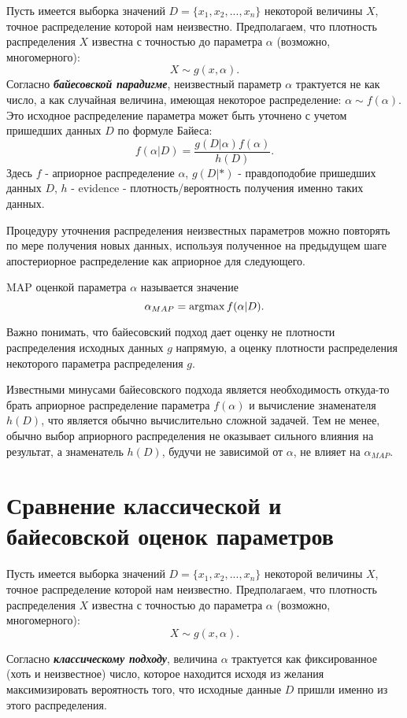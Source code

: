 Пусть имеется выборка значений $D = \{x_1, x_2, ..., x_n\}$ некоторой величины $X$, точное распределение которой нам неизвестно. Предполагаем, что плотность распределения $X$ известна с точностью до параметра $\alpha$ (возможно, многомерного): 
$$
X \sim g(x, \alpha).
$$
Согласно \textbf{\textit{байесовской парадигме}}, неизвестный параметр $\alpha$ трактуется не как число, а как случайная величина, имеющая некоторое распределение: $\alpha \sim f(\alpha)$. Это исходное распределение параметра может быть уточнено с учетом пришедших данных $D$ по формуле Байеса:
$$
f(\alpha | D) = \frac{g(D | \alpha)f(\alpha)}{h(D)}.
$$
Здесь $f$ - априорное распределение $\alpha$, $g(D | *)$ - правдоподобие пришедших данных $D$, 
$h$ - evidence - плотность/вероятность получения именно таких данных.

Процедуру уточнения распределения неизвестных параметров можно повторять по мере получения новых данных, используя полученное на предыдущем шаге апостериорное распределение как априорное для следующего.

MAP оценкой параметра $\alpha$ называется значение
$$
\alpha_{MAP} = \operatorname*{argmax} f(\alpha | D).
$$

Важно понимать, что байесовский подход дает оценку не плотности распределения исходных данных $g$ напрямую, а оценку плотности распределения некоторого параметра распределения $g$.

Известными минусами байесовского подхода является необходимость откуда-то брать априорное распределение параметра $f(\alpha)$ и вычисление знаменателя $h(D)$, что является обычно вычислительно сложной задачей. Тем не менее, обычно выбор априорного распределения не оказывает сильного влияния на результат, а знаменатель $h(D)$, будучи не зависимой от $\alpha$, не влияет на $\alpha_{MAP}$.


\section{Сравнение классической и байесовской оценок параметров}

Пусть имеется выборка значений $D = \{x_1, x_2, ..., x_n\}$ некоторой величины $X$, точное распределение которой нам неизвестно. Предполагаем, что плотность распределения $X$ известна с точностью до параметра $\alpha$ (возможно, многомерного): 
$$
X \sim g(x, \alpha).
$$

Согласно \textbf{\textit{классическому подходу}}, величина $\alpha$ трактуется как фиксированное (хоть и неизвестное) число, которое находится исходя из желания максимизировать вероятность того, что исходные данные $D$ пришли именно из этого распределения.

